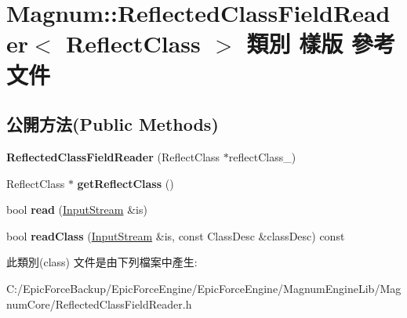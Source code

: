 \hypertarget{class_magnum_1_1_reflected_class_field_reader}{}\section{Magnum\+:\+:Reflected\+Class\+Field\+Reader$<$ Reflect\+Class $>$ 類別 樣版 參考文件}
\label{class_magnum_1_1_reflected_class_field_reader}
\subsection*{公開方法(Public Methods)}
\begin{DoxyCompactItemize}
\item 
{\bfseries Reflected\+Class\+Field\+Reader} (Reflect\+Class $\ast$reflect\+Class\+\_\+)\hypertarget{class_magnum_1_1_reflected_class_field_reader_a8b90c072a5f2319bf0e765e135990368}{}\label{class_magnum_1_1_reflected_class_field_reader_a8b90c072a5f2319bf0e765e135990368}

\item 
Reflect\+Class $\ast$ {\bfseries get\+Reflect\+Class} ()\hypertarget{class_magnum_1_1_reflected_class_field_reader_ab1a309766486a40920467c4141842c9b}{}\label{class_magnum_1_1_reflected_class_field_reader_ab1a309766486a40920467c4141842c9b}

\item 
bool {\bfseries read} (\hyperlink{class_magnum_1_1_input_stream}{Input\+Stream} \&is)\hypertarget{class_magnum_1_1_reflected_class_field_reader_af2724deefe052a5f818c0cfcdac5b440}{}\label{class_magnum_1_1_reflected_class_field_reader_af2724deefe052a5f818c0cfcdac5b440}

\item 
bool {\bfseries read\+Class} (\hyperlink{class_magnum_1_1_input_stream}{Input\+Stream} \&is, const Class\+Desc \&class\+Desc) const \hypertarget{class_magnum_1_1_reflected_class_field_reader_acab02aaea85d67071307f8e5695a92c8}{}\label{class_magnum_1_1_reflected_class_field_reader_acab02aaea85d67071307f8e5695a92c8}

\end{DoxyCompactItemize}


此類別(class) 文件是由下列檔案中產生\+:\begin{DoxyCompactItemize}
\item 
C\+:/\+Epic\+Force\+Backup/\+Epic\+Force\+Engine/\+Epic\+Force\+Engine/\+Magnum\+Engine\+Lib/\+Magnum\+Core/Reflected\+Class\+Field\+Reader.\+h\end{DoxyCompactItemize}
